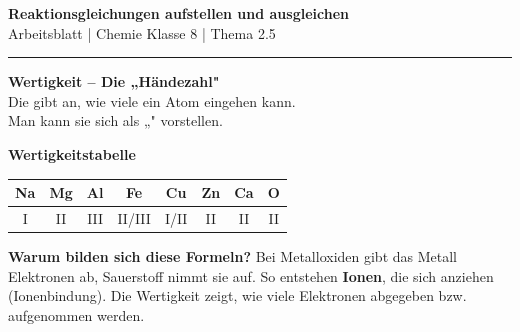 \documentclass[10pt, a4paper]{article}
\newcommand{\fach}{Chemie}
\newcommand{\thema}{Reaktionsgleichungen aufstellen und ausgleichen}
\newcommand{\klasse}{8}
\newcommand{\luecke}[1]{\underline{\hspace{#1}}}
\begin{document}

\begin{center}
    {\large\bfseries\textcolor{fachfarbe}{\thema}}\\[0.1em]
    {\small Arbeitsblatt | \fach{} Klasse \klasse{} | Thema 2.5}
\end{center}
\vspace{-0.4em}
\hrule
\vspace{0.4em}


\begin{minipage}[t]{0.58\textwidth}
\begin{merkkasten}
\textbf{Wertigkeit – Die „Händezahl"}\\[0.2em]
Die \luecke{2.5cm} gibt an, wie viele \luecke{2.5cm} ein Atom eingehen kann.\\[0.3em]
Man kann sie sich als „\luecke{2.5cm}" vorstellen.
\end{merkkasten}
\end{minipage}%
\hfill
\begin{minipage}[t]{0.38\textwidth}
\centering
\small
\textbf{Wertigkeitstabelle}\\[0.3em]
\begin{tabular}{|c|c|c|c|c|c|c|c|}
\hline
\textbf{Na} & \textbf{Mg} & \textbf{Al} & \textbf{Fe} & \textbf{Cu} & \textbf{Zn} & \textbf{Ca} & \textbf{O} \\
\hline
I & II & III & II/III & I/II & II & II & II \\
\hline
\end{tabular}
\end{minipage}

\vspace{4pt}

\begin{hinweisbox}
\small
\textbf{Warum bilden sich diese Formeln?} Bei Metalloxiden gibt das Metall Elektronen ab, Sauerstoff nimmt sie auf. So entstehen \textbf{Ionen}, die sich anziehen (Ionenbindung). Die Wertigkeit zeigt, wie viele Elektronen abgegeben bzw. aufgenommen werden.
\end{hinweisbox}

\vspace{2pt}

\end{document}

